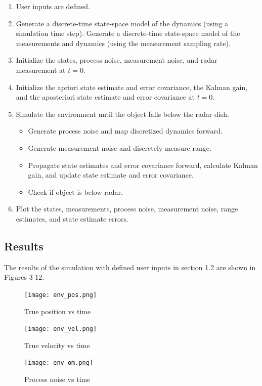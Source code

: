 \documentclass{article}
\begin{document}
\begin{enumerate}
    \item User inputs are defined.
    \item Generate a discrete-time state-space model of the dynamics (using a simulation time step). Generate a discrete-time state-space model of the measurements and dynamics (using the measurement sampling rate).
    \item Initialize the states, process noise, measurement noise, and radar measurement at $t=0$.
    \item Initialize the apriori state estimate and error covariance, the Kalman gain, and the aposteriori state estimate and error covariance at $t=0$.
    \item Simulate the environment until the object falls below the radar dish.
    \begin{itemize}
        \item Generate process noise and map discretized dynamics forward.
        \item Generate measurement noise and discretely measure range.
        \item Propagate state estimates and error covariance forward, calculate Kalman gain, and update state estimate and error covariance.
        \item Check if object is below radar.
    \end{itemize}
    \item Plot the states, measurements, process noise, measurement noise, range estimates, and state estimate errors.
\end{enumerate}

\subsection{Results}
The results of the simulation with defined user inputs in section 1.2 are shown in Figures 3-12.

\begin{figure}[h]
    \centering
    \texttt{[image: env\_pos.png]}
    \caption{True position vs time}
    \label{fig:enter-label}
\end{figure}

\begin{figure}[h]
    \centering
    \texttt{[image: env\_vel.png]}
    \caption{True velocity vs time}
    \label{fig:enter-label}
\end{figure}

\begin{figure}[h]
    \centering
    \texttt{[image: env\_om.png]}
    \caption{Process noise vs time}
    \label{fig:enter-label}
\end{figure}
\end{document}
